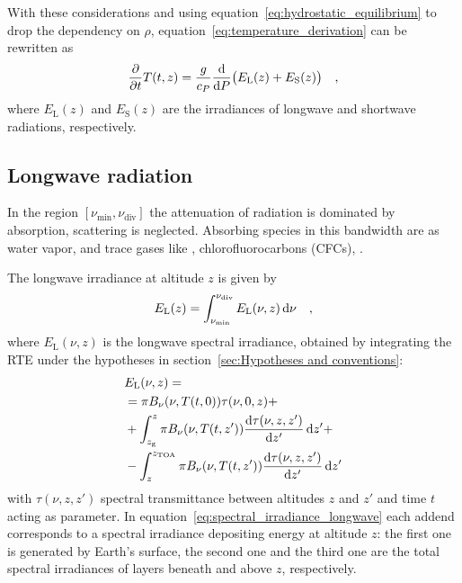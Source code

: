 \documentclass[a4paper,10pt,twocolumn,\classoptions]{article}
\newcommand{\zTOA}{z_\text{TOA}}
\begin{document}
With these considerations and using equation~\eqref{eq:hydrostatic_equilibrium} to drop the dependency on $\rho$, equation~\eqref{eq:temperature_derivation} can be rewritten as
\begin{equation}
  \label{eq:temperature_time_derivative}
  \pdv*{T(t,z)}{t} = \frac{g}{c_P} \odv*{\big( E_\text{L}(z) + E_\text{S}(z) \big)}{P}
  \quad ,
\end{equation}
where $E_\text{L}(z)$ and $E_\text{S}(z)$ are the irradiances of longwave and shortwave radiations, respectively.



\subsection{Longwave radiation}
\label{sec:Longwave radiation}
In the region $[\nu_\text{min}, \nu_\text{div}]$ the attenuation of radiation is dominated by absorption, scattering is neglected.
Absorbing species in this bandwidth are  as water vapor,  and trace gases like , chlorofluorocarbons (CFCs), .

The longwave irradiance at altitude $z$ is given by
\begin{equation}
  \label{eq:irradiance_longwave}
  E_\text{L}(z) = \int_{\nu_\text{min}}^{\nu_\text{div}} E_\text{L}(\nu, z) \odif{\nu}
  \quad ,
\end{equation}
where $E_\text{L}(\nu, z)$ is the longwave spectral irradiance, obtained by integrating the RTE under the hypotheses in section~\ref{sec:Hypotheses and conventions}:
\begin{equation}
  \label{eq:spectral_irradiance_longwave}
  \begin{split}
    & E_\text{L}(\nu, z) = \\
    & = \pi B_\nu(\nu, T(t, 0)) \tau(\nu, 0, z) + \\
    & + \int_{z_\text{g}}^{z} \pi B_\nu(\nu, T(t, z')) \odv{\tau(\nu, z, z')}{z'} \odif{z'} + \\
    & - \int_{z}^{\zTOA} \pi B_\nu(\nu, T(t, z')) \odv{\tau(\nu, z, z')}{z'} \odif{z'}
  \end{split}
\end{equation}
with $\tau(\nu, z, z')$ spectral transmittance between altitudes $z$ and $z'$ and time $t$ acting as parameter.
In equation~\eqref{eq:spectral_irradiance_longwave} each addend corresponds to a spectral irradiance depositing energy at altitude $z$: the first one is generated by Earth's surface, the second one and the third one are the total spectral irradiances of layers beneath and above $z$, respectively.
\end{document}
